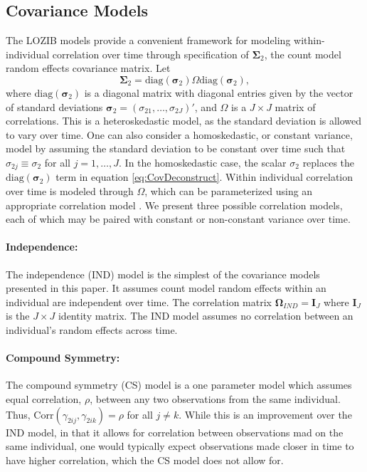 \documentclass[12pt]{article}
\begin{document}
\subsection{Covariance Models}
The LOZIB models provide a convenient framework for modeling within-individual correlation over time through specification of $\bm{\Sigma}_{2}$, the count model random effects covariance matrix. Let 
\begin{equation}
	\bm{\Sigma}_{2} = \text{diag}(\bm{\sigma}_{2}) \Omega \text{diag}(\bm{\sigma}_{2}),
	\label{eq:CovDeconstruct}
\end{equation}
where $\text{diag}(\bm{\sigma}_{2})$ is a diagonal matrix with diagonal entries given by the vector of standard deviations $\bm{\sigma}_{2} = (\sigma_{21}, \dots, \sigma_{2J})'$, and $\Omega$ is a $J \times J$ matrix of correlations. This is a heteroskedastic model, as the standard deviation is allowed to vary over time. One can also consider a homoskedastic, or constant variance, model by assuming the standard deviation to be constant over time such that $\sigma_{2j} \equiv \sigma_{2}$ for all $j=1, \dots, J$. In the homoskedastic case, the scalar $\sigma_{2}$ replaces the $\text{diag}(\bm{\sigma}_{2})$ term in equation \eqref{eq:CovDeconstruct}. Within individual correlation over time is modeled through $\Omega$, which can be parameterized using an appropriate correlation model \citep{liechty2004bayesian, weiss2005modeling}. We present three possible correlation models, each of which may be paired with constant or non-constant variance over time.

\paragraph{Independence:}
The independence (IND) model is the simplest of the covariance models presented in this paper. It assumes count model random effects within an individual are independent over time. The correlation matrix $\bm{\Omega}_{IND} = \bm{I}_{J}$ where $\bm{I}_{J}$ is the $J \times J$ identity matrix. The IND model assumes no correlation between an individual's random effects across time.

\paragraph{Compound Symmetry:}
The compound symmetry (CS) model is a one parameter model which assumes equal correlation, $\rho$, between any two observations from the same individual. Thus, Corr$(\gamma_{2ij}, \gamma_{2ik}) = \rho$ for all $j \neq k$. While this is an improvement over the IND model, in that it allows for correlation between observations mad on the same individual, one would typically expect observations made closer in time to have higher correlation, which the CS model does not allow for. 
\end{document}
